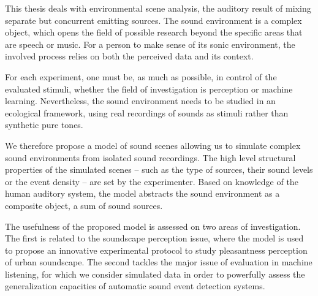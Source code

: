 This thesis deals with environmental scene analysis, the auditory result of mixing separate but concurrent emitting sources.  The sound environment is a complex object, which opens the field of possible research beyond the specific areas that are speech or music. For a person to make sense of its sonic environment, the involved process relies on both the perceived data and its context.

For each experiment, one must be, as much as possible, in control of the evaluated stimuli, whether the field of investigation is perception or machine learning. Nevertheless, the sound environment needs to be studied in an ecological framework, using real recordings of sounds as stimuli rather than synthetic pure tones.

We therefore propose a model of sound scenes allowing us to simulate complex sound environments from isolated sound recordings. The high level structural properties of the simulated scenes -- such as the type of sources, their sound levels or the event density -- are set by the experimenter. Based on knowledge of the human auditory system,  the model abstracts the sound environment as a composite object, a sum of sound sources.

The usefulness of the proposed model is assessed on two areas of investigation. The first is related to the soundscape perception issue, where the model is used to propose an innovative experimental protocol to study pleasantness perception of urban soundscape. The second tackles the major issue of evaluation in machine listening, for which we consider simulated data in order to powerfully assess the generalization capacities of automatic sound event detection systems. 

